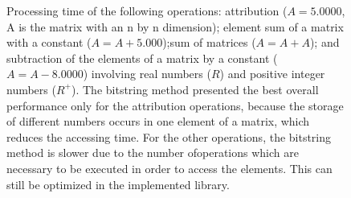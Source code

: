 \documentclass[10pt]{article}
\begin{document}
\begin{figure}[h]
{  }
  \caption{Processing time of the following operations: attribution ($A=5.0000$, 
A is the matrix with an n by n dimension); 
  element sum of a matrix with a constant ($A=A+5.000$);sum of matrices 
($A=A+A$); and subtraction of the elements of a 
  matrix by a constant ($A=A-8.0000$) involving real numbers ($R$) and positive 
integer numbers ($R^+$). The bitstring 
  method presented the best overall performance only for the attribution 
operations, because the storage of 
  different numbers occurs in one element of a matrix, which reduces the 
accessing time. For the other operations, 
  the bitstring method is slower due to the number ofoperations which are 
necessary to be  executed in order to 
  access the elements. This can still be optimized in the implemented library.}
  \label{fig:31323334}
\end{figure}
\end{document}
